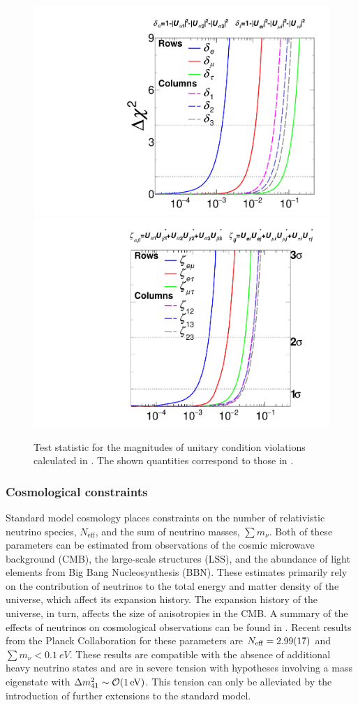\begin{figure}
    \centering
    \includegraphics[width=0.49\linewidth]{figures/theory/Norm.pdf}
    \includegraphics[width=0.49\linewidth]{figures/theory/Clos_temp.pdf}
    \caption{Test statistic for the magnitudes of unitary condition violations calculated in \cite{global_unitarity_Hu}. The shown quantities correspond to those in .\label{fig:nonunitary-global-fits}}
\end{figure}

\subsubsection{Cosmological constraints}
Standard model cosmology places constraints on the number of relativistic neutrino species, $N_\mathrm{eff}$, and the sum of neutrino masses, $\sum m_\nu$.
Both of these parameters can be estimated from observations of the cosmic microwave background (CMB), the large-scale structures (LSS), and the abundance of light elements from Big Bang Nucleosynthesis (BBN).
These estimates primarily rely on the contribution of neutrinos to the total energy and matter density of the universe, which affect its expansion history. The expansion history of the universe, in turn, affects the size of anisotropies in the CMB. A summary of the effects of neutrinos on cosmological observations can be found in .
Recent results from the Planck Collaboration for these parameters are $N_\mathrm{eff}=\num{2.99+-0.17}$ and $\sum m_\nu < \SI{0.1}{eV}$. These results are compatible with the absence of additional heavy neutrino states and are in severe tension with hypotheses involving a mass eigenstate with $\Delta m^2_{41} \sim \order{\SI{1}{eV}}$.
This tension can only be alleviated by the introduction of further extensions to the standard model.

